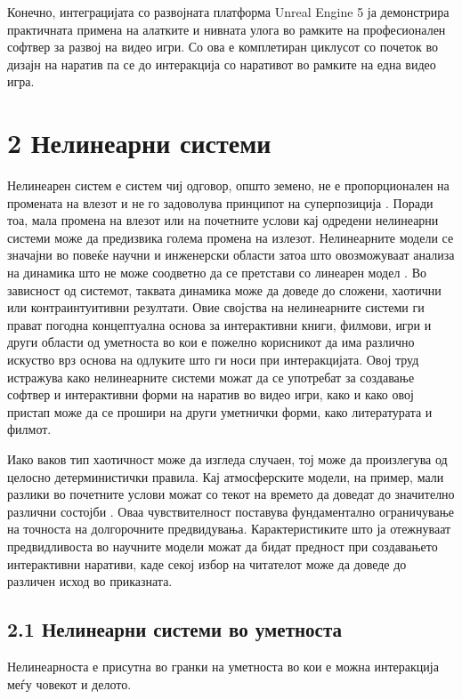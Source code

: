 Конечно, интеграцијата со развојната платформа Unreal Engine 5 ја демонстрира практичната примена на алатките и нивната улога во рамките на професионален софтвер за развој на видео игри. Со ова е комплетиран циклусот со почеток во дизајн на наратив па се до интеракција со наративот во рамките на една видео игра.

\section{2 Нелинеарни системи}

Нелинеарен систем е систем чиј одговор, општо земено, не е пропорционален на промената на влезот и не го задоволува принципот на суперпозиција \cite{ref9,ref12}. Поради тоа, мала промена на влезот или на почетните услови кај одредени нелинеарни системи може да предизвика голема промена на излезот. Нелинеарните модели се значајни во повеќе научни и инженерски области затоа што овозможуваат анализа на динамика што не може соодветно да се претстави со линеарен модел \cite{ref4}. Во зависност од системот, таквата динамика може да доведе до сложени, хаотични или контраинтуитивни резултати. Овие својства на нелинеарните системи ги прават погодна концептуална основа за интерактивни книги, филмови, игри и други области од уметноста во кои е пожелно корисникот да има различно искуство врз основа на одлуките што ги носи при интеракцијата. Овој труд истражува како нелинеарните системи можат да се употребат за создавање софтвер и интерактивни форми на наратив во видео игри, како и како овој пристап може да се прошири на други уметнички форми, како литературата и филмот.

Иако ваков тип хаотичност може да изгледа случаен, тој може да произлегува од целосно детерминистички правила. Кај атмосферските модели, на пример, мали разлики во почетните услови можат со текот на времето да доведат до значително различни состојби \cite{ref11}. Оваа чувствителност поставува фундаментално ограничување на точноста на долгорочните предвидувања. Карактеристиките што ја отежнуваат предвидливоста во научните модели можат да бидат предност при создавањето интерактивни наративи, каде секој избор на читателот може да доведе до различен исход во приказната.

\subsection{2.1 Нелинеарни системи во уметноста}

Нелинеарноста е присутна во гранки на уметноста во кои е можна интеракција меѓу човекот и делото.

